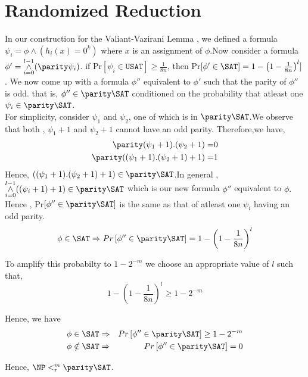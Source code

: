 \documentclass[11pt]{article}
\begin{document}
\section{Randomized Reduction}

	In our construction for the Valiant-Vazirani Lemma , we defined a formula $\psi_i = \phi \wedge (h_i(x)= 0^k)$
where $x$ is an assignment of $\phi$.Now consider a formula $\phi' = \overset{l-1}{\underset{i = 0} \wedge } (\parity
\psi_i)$. if Pr$\left[\psi_i \in \texttt{USAT} \right] \geq \frac{1}{8n}$, then Pr$\left[ \phi' \in \SAT\right] = 1 -
\left(1 - \frac{1}{8n } \right)^l]$. We now come up with a formula $\phi''$ equivalent to $\phi'$ such that the parity
of $\phi''$  is odd. that is, $\phi'' \in \parity \SAT$ conditioned on the probability that atleast one $\psi_i \in
\parity \SAT $.\\
For simplicity, consider $\psi_1$ and $\psi_2$, one of which is in $\parity \SAT$.We observe that both ,
$\psi_1 + 1$ and $\psi_2 + 1$ cannot have an odd parity. Therefore,we have, 
\begin{align*}
\parity(\psi_1 + 1) .(\psi_2 + 1) =& 0\\
\parity((\psi_1 + 1) .(\psi_2 + 1)+ 1) =& 1 
\end{align*}
Hence, $((\psi_1 + 1) .(\psi_2 + 1)+ 1) \in \parity \SAT$.In general , 
$\overset{l-1}{ \underset{i = 0}\wedge} ((\psi_i + 1)+ 1) \in \parity \SAT$ which is our new formula $\phi''$
equivalent to $\phi.$ Hence , Pr$\left[\phi'' \in \parity \SAT \right]$ is the same as that of atleast one $\psi_i$
having an odd parity.
 \[\phi \in \SAT \Rightarrow Pr \left[\phi'' \in \parity \SAT \right] =1 -\left(1 - \frac{1}{8n }\right)^l \]

To amplify this probabilty to $1 - 2^{-m} $ we choose an appropriate value of $l$ such that,
\[1 -\left(1 - \frac{1}{8n }\right)^l \geq 1 - 2^{-m} \]

Hence, we have 
\begin{eqnarray*}
 \phi \in \SAT & \Rightarrow &  Pr\left[\phi'' \in \parity \SAT \right]\geq  1 - 2^{-m} \\
 \phi \notin \SAT & \Rightarrow & Pr\left[\phi'' \in \parity \SAT \right] = 0 
\end{eqnarray*}

Hence, $\NP <^m_r \parity \SAT$.
 
\end{document}
